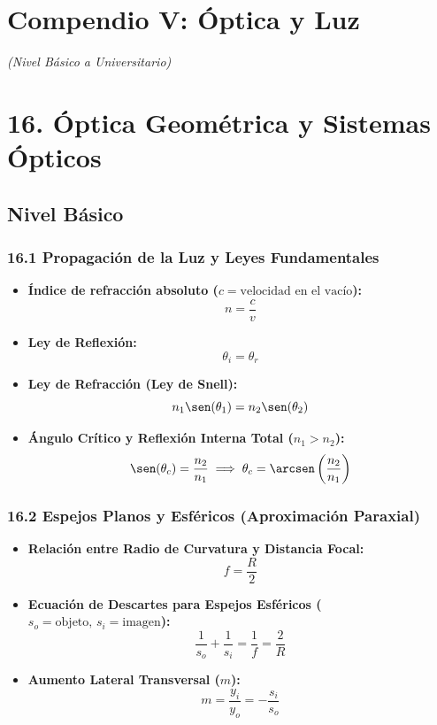\documentclass[11pt,a4paper]{article}
\begin{document}
\section*{Compendio V: Óptica y Luz}

\textit{(Nivel Básico a Universitario)}

\section*{16. Óptica Geométrica y Sistemas Ópticos}

\subsection*{Nivel Básico}

\subsubsection*{16.1 Propagación de la Luz y Leyes Fundamentales}

\begin{itemize}
  \item \textbf{Índice de refracción absoluto ($c = \text{velocidad en el vacío}$):}
  \[
    n = \frac{c}{v}
  \]
  \item \textbf{Ley de Reflexión:}
  \[
    \theta_i = \theta_r
  \]
  \item \textbf{Ley de Refracción (Ley de Snell):}
  \[
    n_1 \sen(\theta_1) = n_2 \sen(\theta_2)
  \]
  \item \textbf{Ángulo Crítico y Reflexión Interna Total ($n_1 > n_2$):}
  \[
    \sen(\theta_c) = \frac{n_2}{n_1} \implies \theta_c = \arcsen\left( \frac{n_2}{n_1} \right)
  \]
\end{itemize}

\subsubsection*{16.2 Espejos Planos y Esféricos (Aproximación Paraxial)}

\begin{itemize}
  \item \textbf{Relación entre Radio de Curvatura y Distancia Focal:}
  \[
    f = \frac{R}{2}
  \]
  \item \textbf{Ecuación de Descartes para Espejos Esféricos ($s_o = \text{objeto}, \, s_i = \text{imagen}$):}
  \[
    \frac{1}{s_o} + \frac{1}{s_i} = \frac{1}{f} = \frac{2}{R}
  \]
  \item \textbf{Aumento Lateral Transversal ($m$):}
  \[
    m = \frac{y_i}{y_o} = -\frac{s_i}{s_o}
  \]
\end{itemize}
\end{document}
